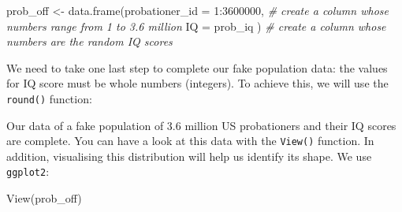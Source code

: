 \documentclass[
]{book}
\newenvironment{Shaded}{\begin{snugshade}}{\end{snugshade}}
\newcommand{\AttributeTok}[1]{\textcolor[rgb]{0.77,0.63,0.00}{#1}}
\newcommand{\CommentTok}[1]{\textcolor[rgb]{0.56,0.35,0.01}{\textit{#1}}}
\newcommand{\DecValTok}[1]{\textcolor[rgb]{0.00,0.00,0.81}{#1}}
\newcommand{\FunctionTok}[1]{\textcolor[rgb]{0.00,0.00,0.00}{#1}}
\newcommand{\NormalTok}[1]{#1}
\newcommand{\OtherTok}[1]{\textcolor[rgb]{0.56,0.35,0.01}{#1}}
\newcommand{\SpecialCharTok}[1]{\textcolor[rgb]{0.00,0.00,0.00}{#1}}
\newcommand{\StringTok}[1]{\textcolor[rgb]{0.31,0.60,0.02}{#1}}
\begin{document}
\begin{Shaded}
\begin{Highlighting}[]
\NormalTok{prob\_off }\OtherTok{\textless{}{-}} \FunctionTok{data.frame}\NormalTok{(}\AttributeTok{probationer\_id =} \DecValTok{1}\SpecialCharTok{:}\DecValTok{3600000}\NormalTok{,      }\CommentTok{\# create a column whose numbers range from 1 to 3.6 million}
                       \AttributeTok{IQ =}\NormalTok{ prob\_iq )     }\CommentTok{\# create a column whose numbers are the random IQ scores}
\end{Highlighting}
\end{Shaded}

We need to take one last step to complete our fake population data: the values for IQ score must be whole numbers (integers). To achieve this, we will use the \texttt{round()} function:

\begin{Shaded}
\end{Shaded}

Our data of a fake population of 3.6 million US probationers and their IQ scores are complete. You can have a look at this data with the \texttt{View()} function. In addition, visualising this distribution will help us identify its shape. We use \texttt{ggplot2}:

\begin{Shaded}
\begin{Highlighting}[]
\FunctionTok{View}\NormalTok{(prob\_off)}
\end{Highlighting}
\end{Shaded}

\begin{Shaded}
\end{Shaded}
\end{document}
